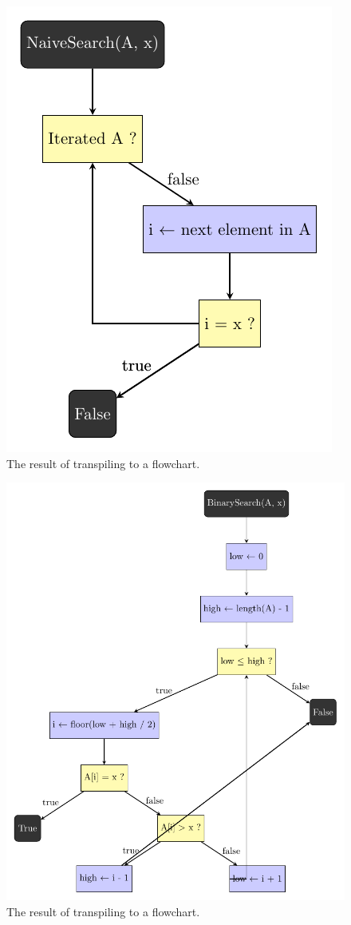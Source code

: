 \begin{figure}[ht!]
    \centering
    \includegraphics[scale=.7]{assets/chapter6/search/NaiveSearch_ibp.pdf}
    \caption{The result of transpiling  to a flowchart.}
    \label{naiveSearchIBP}
\end{figure}

\begin{figure}[ht!]
    \centering
    \includegraphics[scale=.65]{assets/chapter6/search/BinarySearch_ibp.pdf}
    \caption{The result of transpiling  to a flowchart.}
    \label{binarySearchIBP}
\end{figure}
